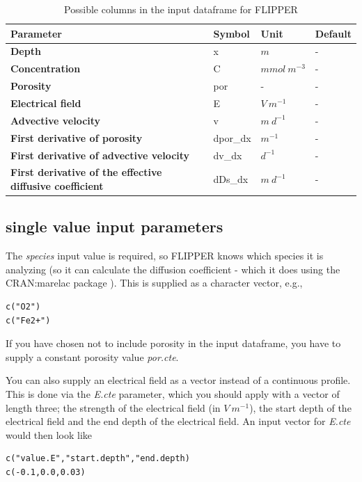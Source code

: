 \documentclass[10pt]{article}
\begin{document}
\begin{table}[!h]
	\small
	\caption{Possible columns in the input dataframe for FLIPPER}
	\begin{tabular}{p{5cm} p{1.5cm} p{2cm} p{2cm}}
		\hline
		\textbf{Parameter} & \textbf{Symbol} & \textbf{Unit} & \textbf{Default} \\     
		 \hline
		\textbf{Depth} & x & $m$ & -  \\
		\textbf{Concentration} & C & $mmol \: m^{-3}$ & -  \\
		\textbf{Porosity} & por & - & -  \\
		\textbf{Electrical field} & E & $V \: m^{-1}$ & -  \\
		\textbf{Advective velocity} & v & $m \: d^{-1}$ & -  \\
		\textbf{First derivative of porosity} & dpor\_dx & $m^{-1}$ & -  \\
		\textbf{First derivative of advective velocity} & dv\_dx & $d^{-1}$ & -  \\
		\textbf{First derivative of the effective diffusive coefficient} & dDs\_dx & $m \: d^{-1}$ & -  \\
		\hline
	\end{tabular}
	\label{table_inputdf}
\end{table}


\subsection{single value input parameters}
The \textit{species} input value is required, so FLIPPER knows which species it is analyzing (so it can calculate the diffusion coefficient - which it does using the CRAN:marelac package \cite{Soetaert2010}). This is supplied as a character vector, e.g.,
\begin{verbatim}
c("O2")
c("Fe2+")
\end{verbatim}

If you have chosen not to include porosity in the input dataframe, you have to supply a constant porosity value \textit{por.cte}. 

You can also supply an electrical field as a vector instead of a continuous profile. This is done via the \textit{E.cte} parameter, which you should apply with a vector of length three; the strength of the electrical field (in $V \: m^{-1}$), the start depth of the electrical field and the end depth of the electrical field. An input vector for \textit{E.cte} would then look like
\begin{verbatim}
c("value.E","start.depth","end.depth)
c(-0.1,0.0,0.03)
\end{verbatim}
\end{document}
